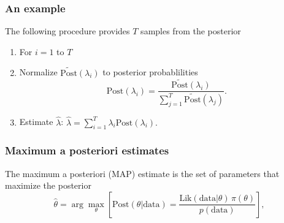 \begin{frame}[fragile]\frametitle{An example}

{\tiny

The following procedure provides $T$ samples from the posterior
\begin{enumerate}

\item For $i = 1$ to $T$ 


\item Normalize $\tilde{\mbox{Post}}(\lambda_i)$ to posterior
probablilities 
$$\mbox{Post}(\lambda_i)
=\frac{\tilde{\mbox{Post}}(\lambda_i)}{\sum_{j=1}^T
  \tilde{\mbox{Post}}(\lambda_j)}.$$ 

\item Estimate $\hat{\lambda}$: $\hat{\lambda} = \sum_{i=1}^T \lambda_i \mbox{Post}(\lambda_i).$

\end{enumerate}

}
\end{frame}



\begin{frame}[fragile]\frametitle{Maximum a posteriori estimates}

\begin{defn}
The maximum a posteriori (MAP) estimate is the set
of parameters that maximize the posterior
$$ \hat{\theta} = \arg \max_\theta \left[\mbox{Post}(\theta|\mbox{data}) =
\frac{\mbox{Lik}(\mbox{data}|\theta) \,
  \pi(\theta)}{p(\mbox{data})}\right],$$ 
\end{defn}

 \end{frame}


